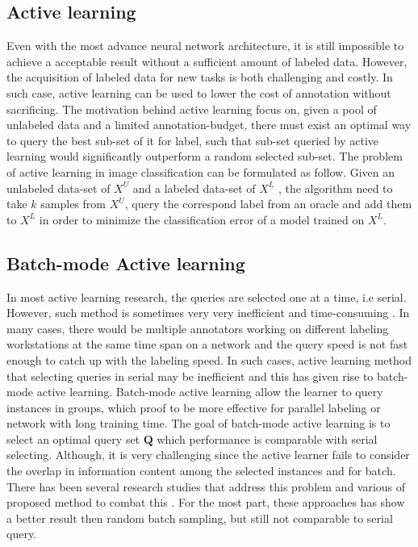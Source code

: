 \subsection{Active learning}
Even with the most advance neural network architecture, it is still impossible to achieve a acceptable result without a sufficient amount of labeled data. However, the acquisition of labeled data for new tasks is both challenging and costly. In such case, active learning can be used to lower the cost of annotation without sacrificing. The motivation behind active learning focus on, given a pool of unlabeled data and a limited annotation-budget, there must exist an optimal way to query the best sub-set of it for label, such that sub-set queried by active learning would significantly outperform a random selected sub-set. The problem of active learning in image classification can be formulated as follow. Given  an unlabeled data-set of $X^U$ and a labeled data-set of $X^L$ , the algorithm need to take $k$ samples from $X^U$, query the correspond label from an oracle and add them to $X^L$ in order to minimize the classification error of a model trained on $X^L$.
\subsection{Batch-mode Active learning}
In most active learning research, the queries are selected one at a time, i.e serial. However, such method is sometimes very very inefficient and time-consuming \cite{activelearningbook}. In many cases, there would be multiple annotators working on different labeling workstations at the same time span on a network and the query speed is not fast enough to catch up with the labeling speed. In such cases, active learning method that selecting queries in serial may be inefficient and this has given rise to batch-mode active learning. Batch-mode active learning allow the learner to query instances in groups, which proof to be more effective for parallel labeling or network with long training time. The goal of batch-mode active learning is to select an optimal query set $\mathbf{Q}$ which performance is comparable with serial selecting. Although, it is very challenging since the active learner fails to consider the overlap in information content among the selected instances and for batch. There has been several research studies that address this problem \cite{Discriminativebatchmode} and various of proposed method to combat this \cite{6912976}. For the most part, these approaches has show a better result then random batch sampling, but still not comparable to serial query. \cite{activelearningbook}
